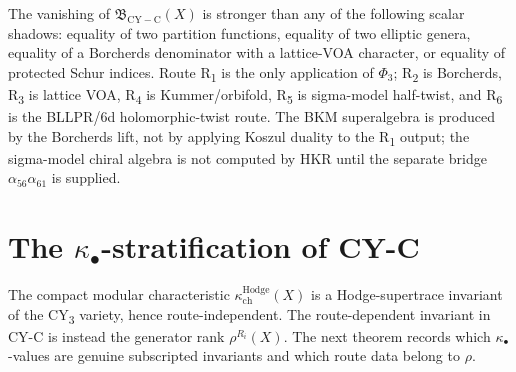 \begin{remark}
\label{rem:cy-c-scalar-shadow-exclusions}
The vanishing of \(\mathfrak B_{\mathrm{CY-C}}(X)\) is stronger than
any of the following scalar shadows: equality of two partition
functions, equality of two elliptic genera, equality of a Borcherds
denominator with a lattice-VOA character, or equality of protected
Schur indices. Route R\textsubscript{1} is the only application of
\(\Phi_3\); R\textsubscript{2} is Borcherds, R\textsubscript{3} is
lattice VOA, R\textsubscript{4} is Kummer/orbifold, R\textsubscript{5}
is sigma-model half-twist, and R\textsubscript{6} is the BLLPR/6d
holomorphic-twist route. The BKM superalgebra is produced by the
Borcherds lift, not by applying Koszul duality to the R\textsubscript{1}
output; the sigma-model chiral algebra is not computed by HKR until the
separate bridge \(\alpha_{56}\alpha_{61}\) is supplied.
\end{remark}

\section{The \texorpdfstring{$\kappa_\bullet$}{kappa-.}-stratification of CY-C}
\label{sec:cy-c-kappa-stratification}

The compact modular characteristic $\kappa_{\mathrm{ch}}^{\mathrm{Hodge}}(X)$ is a Hodge-supertrace invariant of the CY\textsubscript{3} variety, hence route-independent. The route-dependent invariant in CY-C is instead the generator rank $\rho^{R_i}(X)$. The next theorem records which $\kappa_\bullet$-values are genuine subscripted invariants and which route data belong to $\rho$.


